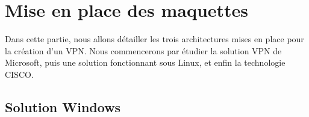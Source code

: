 \section{Mise en place des maquettes}

Dans cette partie, nous allons détailler les trois architectures mises en place pour la création d'un VPN. Nous commencerons par étudier la solution VPN de Microsoft, puis une solution fonctionnant sous Linux, et enfin la technologie CISCO.

\subsection{Solution Windows}








\pagebreak
